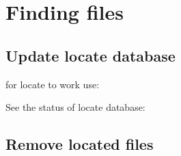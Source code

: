 \section{Finding files}
\subsection{Update locate database}
for locate to work use:

See the status of locate database:

\subsection{Remove located files}
